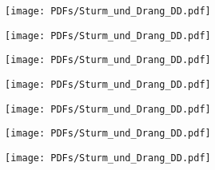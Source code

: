 \documentclass[a3paper,11pt, landscape]{article}
\begin{document}
\begin{minipage}{0.5\textwidth}
	\texttt{[image: PDFs/Sturm\_und\_Drang\_DD.pdf]}
\end{minipage}

\begin{minipage}{0.5\textwidth}
	\texttt{[image: PDFs/Sturm\_und\_Drang\_DD.pdf]}
\end{minipage}

\begin{minipage}{0.5\textwidth}
	\texttt{[image: PDFs/Sturm\_und\_Drang\_DD.pdf]}
\end{minipage}

\begin{minipage}{0.5\textwidth}
	\texttt{[image: PDFs/Sturm\_und\_Drang\_DD.pdf]}
\end{minipage}

\begin{minipage}{0.5\textwidth}
	\texttt{[image: PDFs/Sturm\_und\_Drang\_DD.pdf]}
\end{minipage}

\begin{minipage}{0.5\textwidth}
	\texttt{[image: PDFs/Sturm\_und\_Drang\_DD.pdf]}
\end{minipage}

\begin{minipage}{0.5\textwidth}
	\texttt{[image: PDFs/Sturm\_und\_Drang\_DD.pdf]}
\end{minipage}
\end{document}
